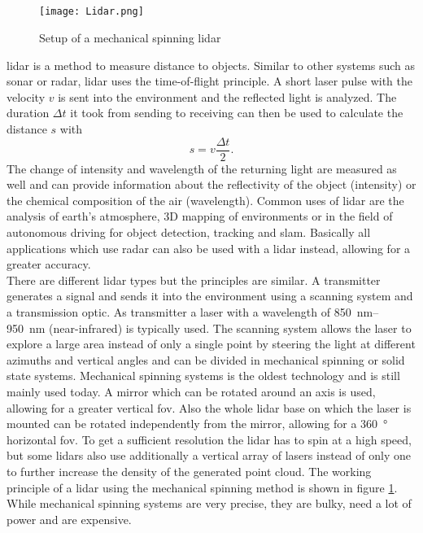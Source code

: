\subsection{}
\begin{figure}[htb]
	\centering
	\texttt{[image: Lidar.png]}
	\caption{Setup of a mechanical spinning \gls{lidar} \cite{Li2020}}
	\label{fig:lidar}
\end{figure}
\gls{lidar} is a method to measure distance to objects.
Similar to other systems such as \gls{sonar} or \gls{radar}, \gls{lidar} uses the time-of-flight principle.
A short laser pulse with the velocity $v$ is sent into the environment and the reflected light is analyzed.
The duration $\Delta t$ it took from sending to receiving can then be used to calculate the distance $s$ with
\[ s = v\frac{\Delta t}{2}. \]
The change of intensity and wavelength of the returning light are measured as well and can provide information about the reflectivity of the object (intensity) or the chemical composition of the air (wavelength).
Common uses of \gls{lidar} are the analysis of earth's atmosphere, 3D mapping of environments or in the field of autonomous driving for object detection, tracking and \gls{slam}.
Basically all applications which use \gls{radar} can also be used with a \gls{lidar} instead, allowing for a greater accuracy.\\
There are different \gls{lidar} types but the principles are similar.
A transmitter generates a signal and sends it into the environment using a scanning system and a transmission optic.
As transmitter a laser with a wavelength of \SIrange{850}{950}{\nano\metre} (near-infrared) is typically used.
The scanning system allows the laser to explore a large area instead of only a single point by steering the light at different azimuths and vertical angles and can be divided in mechanical spinning or solid state systems.
Mechanical spinning systems is the oldest technology and is still mainly used today.
A mirror which can be rotated around an axis is used, allowing for a greater vertical \gls{fov}.
Also the whole \gls{lidar} base on which the laser is mounted can be rotated independently from the mirror, allowing for a \SI{360}{\degree} horizontal \gls{fov}.
To get a sufficient resolution the \gls{lidar} has to spin at a high speed, but some \gls{lidar}s also use additionally a vertical array of lasers instead of only one to further increase the density of the generated point cloud.
The working principle of a \gls{lidar} using the mechanical spinning method is shown in figure \ref{fig:lidar}.
While mechanical spinning systems are very precise, they are bulky, need a lot of power and are expensive.

